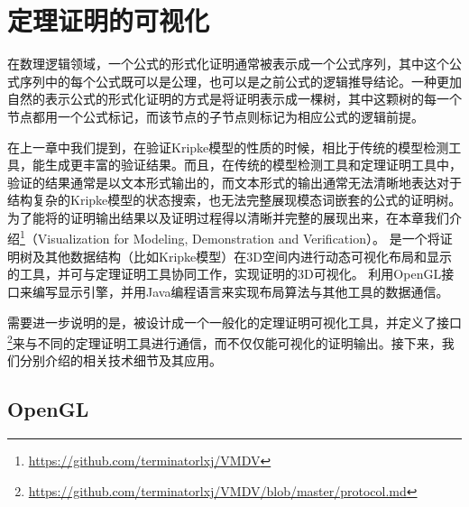 \chapter{定理证明的可视化}
在数理逻辑领域，一个公式的形式化证明通常被表示成一个公式序列，其中这个公式序列中的每个公式既可以是公理，也可以是之前公式的逻辑推导结论。一种更加自然的表示公式的形式化证明的方式是将证明表示成一棵树，其中这颗树的每一个节点都用一个公式标记，而该节点的子节点则标记为相应公式的逻辑前提。


在上一章中我们提到，\sctlprov{}在验证Kripke模型的性质的时候，相比于传统的模型检测工具，能生成更丰富的验证结果。而且，在传统的模型检测工具和定理证明工具中，验证的结果通常是以文本形式输出的，而文本形式的输出通常无法清晰地表达对于结构复杂的Kripke模型的状态搜索，也无法完整展现模态词嵌套的公式的证明树。为了能将\sctlprov{}的证明输出结果以及证明过程得以清晰并完整的展现出来，在本章我们介绍\footnote{\url{https://github.com/terminatorlxj/VMDV}}（Visualization for Modeling, Demonstration and Verification）。
是一个将证明树及其他数据结构（比如Kripke模型）在3D空间内进行动态可视化布局和显示的工具，并可与定理证明工具协同工作，实现证明的3D可视化。
利用OpenGL接口来编写显示引擎，并用Java编程语言来实现布局算法与其他工具的数据通信。

需要进一步说明的是，被设计成一个一般化的定理证明可视化工具，并定义了接口\footnote{\url{https://github.com/terminatorlxj/VMDV/blob/master/protocol.md}}来与不同的定理证明工具进行通信，而不仅仅能可视化\sctlprov{}的证明输出。接下来，我们分别介绍的相关技术细节及其应用。

\section{OpenGL}\label{vmdv:opengl}